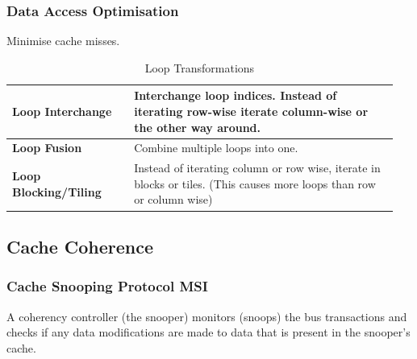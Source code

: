 		\subsubsection{Data Access Optimisation }		
			Minimise cache misses.
			
			\begin{table}[H]
				\centering
				\begin{tabular}{|>{\bfseries}p{0.3\linewidth}|p{0.65\linewidth}|}
					\hline
					Loop Interchange
						& Interchange loop indices. Instead of iterating row-wise iterate column-wise or the other way around.\\
					\hline
					Loop Fusion
						& Combine multiple loops into one. \\
					\hline
					Loop Blocking/Tiling
						& Instead of iterating column or row wise, iterate in blocks or tiles. (This causes more loops than row or column wise)\\
					\hline
				\end{tabular}
				\caption{Loop Transformations}
			\end{table}
			
			
	\subsection{Cache Coherence }
		\subsubsection{Cache Snooping Protocol MSI }
			A coherency controller (the snooper) monitors (snoops) the bus transactions and checks if any data modifications are made to data that is present in the snooper's cache.
			

